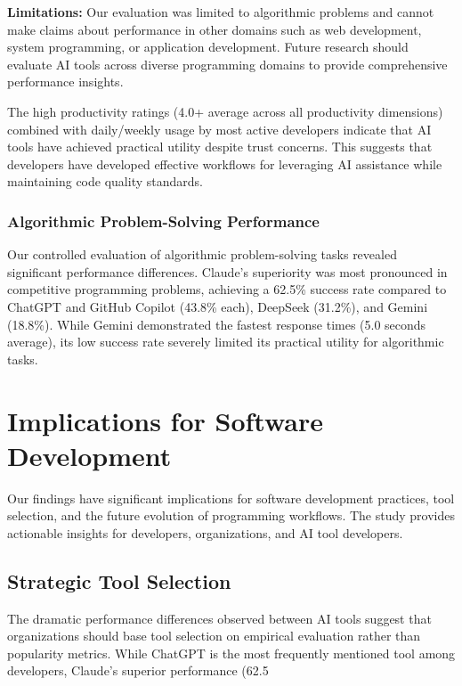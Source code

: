 \documentclass[conference]{IEEEtran}
\begin{document}
\textbf{Limitations:} Our evaluation was limited to algorithmic problems and cannot make claims about performance in other domains such as web development, system programming, or application development. Future research should evaluate AI tools across diverse programming domains to provide comprehensive performance insights.

The high productivity ratings (4.0+ average across all productivity dimensions) combined with daily/weekly usage by most active developers indicate that AI tools have achieved practical utility despite trust concerns. This suggests that developers have developed effective workflows for leveraging AI assistance while maintaining code quality standards.

\subsubsection{Algorithmic Problem-Solving Performance}

Our controlled evaluation of algorithmic problem-solving tasks revealed significant performance differences. Claude's superiority was most pronounced in competitive programming problems, achieving a 62.5\% success rate compared to ChatGPT and GitHub Copilot (43.8\% each), DeepSeek (31.2\%), and Gemini (18.8\%). While Gemini demonstrated the fastest response times (5.0 seconds average), its low success rate severely limited its practical utility for algorithmic tasks.

\section{Implications for Software Development}

Our findings have significant implications for software development practices, tool selection, and the future evolution of programming workflows. The study provides actionable insights for developers, organizations, and AI tool developers.

\subsection{Strategic Tool Selection}

The dramatic performance differences observed between AI tools suggest that organizations should base tool selection on empirical evaluation rather than popularity metrics. While ChatGPT is the most frequently mentioned tool among developers, Claude's superior performance (62.5%
\end{document}
